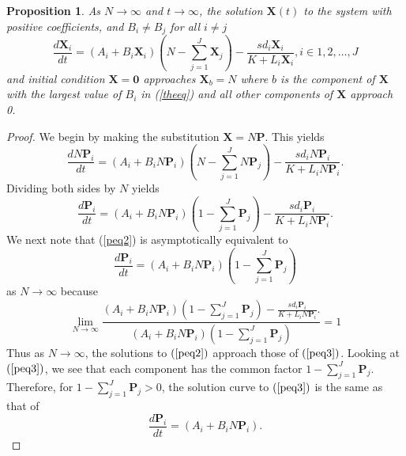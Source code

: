 \documentclass{article}
\newtheorem{prop}{Proposition}
\begin{document}
\begin{prop}
  As $N \rightarrow \infty$ and $t \rightarrow \infty$, the solution $\mathbf{X}(t)$ to the system with positive coefficients, and $B_i \ne B_j$ for all $i \ne j$
  \begin{equation}
    \frac{d \mathbf{X}_i}{dt} = (A_i + B_i\mathbf{X}_i)\left(N - \sum_{j=1}^J\mathbf{X}_j\right) - \frac{sd_i\mathbf{X}_i}{K+L_i\mathbf{X}_i}, i \in 1, 2, \dots, J
    \label{theeq}
  \end{equation}
  and initial condition $\mathbf{X} = \mathbf{0}$ approaches $\mathbf{X}_b = N$ where $b$ is the component of $\mathbf{X}$ with the largest value of $B_i$ in (\ref{theeq}) and all other components of $\mathbf{X}$ approach 0. 
\end{prop}
\begin{proof}
  We begin by making the substitution $\mathbf{X} = N\mathbf{P}$. This yields
  \begin{equation}
    \frac{d N\mathbf{P}_i}{dt} = (A_i + B_iN\mathbf{P}_i)\left(N - \sum_{j=1}^JN\mathbf{P}_j\right) - \frac{sd_iN\mathbf{P}_i}{K+L_iN\mathbf{P}_i}.
    \label{peq1}
  \end{equation}
  Dividing both sides by $N$ yields
  \begin{equation}
    \frac{d \mathbf{P}_i}{dt} = (A_i + B_iN\mathbf{P}_i)\left(1 - \sum_{j=1}^J\mathbf{P}_j\right) - \frac{sd_i\mathbf{P}_i}{K+L_iN\mathbf{P}_i}.
    \label{peq2}
  \end{equation}
  We next note that (\ref{peq2}) is asymptotically equivalent to
  \begin{equation}
    \frac{d \mathbf{P}_i}{dt} = (A_i + B_iN\mathbf{P}_i)\left(1 - \sum_{j=1}^J\mathbf{P}_j\right) 
    \label{peq3}
  \end{equation}
  as $N \rightarrow \infty$ because
  \begin{equation}
    \lim_{N\rightarrow\infty} \frac{ (A_i + B_iN\mathbf{P}_i)\left(1 - \sum_{j=1}^J\mathbf{P}_j\right) - \frac{sd_i\mathbf{P}_i}{K+L_iN\mathbf{P}_i}.
 }{  (A_i + B_iN\mathbf{P}_i)\left(1 - \sum_{j=1}^J\mathbf{P}_j\right) 
} = 1
    \label{asymptotic}
  \end{equation}
  Thus as $N \rightarrow \infty$, the solutions to $(\ref{peq2})$ approach those of $(\ref{peq3})$. Looking at $(\ref{peq3})$, we see that each component has the common factor $1 - \sum_{j=1}^J \mathbf{P}_j$. Therefore, for $1-\sum_{j=1}^J \mathbf{P}_j > 0$, the solution curve to $(\ref{peq3})$ is the same as that of
  \begin{equation}
    \frac{d \mathbf{P}_i}{dt} = (A_i + B_iN\mathbf{P}_i).

\end{equation}
\end{proof}
\end{document}

